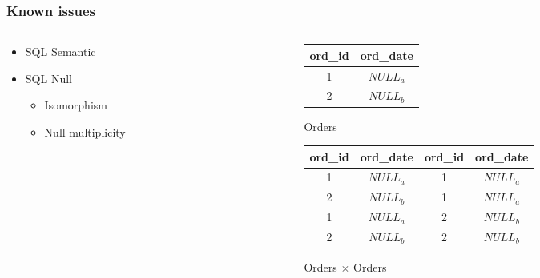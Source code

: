 \documentclass{beamer}
\begin{document}
		\begin{frame}
			\frametitle{Known issues}
			\begin{columns}
				\begin{column}{0.40\textwidth}
					\begin{itemize}
						\item SQL Semantic 
						\item<2->SQL Null
						\begin{itemize}
							\item<3-> Isomorphism
							\item<6-> Null multiplicity
						\end{itemize}
					\end{itemize}
				\end{column}
				\begin{column}{0.60\textwidth}
					\onslide<4->
					\begin{figure}
					\caption{Orders}
					\begin{tabular}{cc}
						\hline
						ord\_id & ord\_date \\
						\hline
						1 &  $NULL_a$ \\
						2 &  $NULL_b$ \\
						\hline
					\end{tabular}
				\end{figure}
				\begin{figure}
					\caption{Orders $\times$ Orders}
					\begin{tabular}{cccc}
						\hline
						ord\_id & ord\_date & ord\_id & ord\_date\\
						\hline
						1 &  $NULL_a$ & 1 &  $NULL_a$\\
						2 &  $NULL_b$ & 1 &  $NULL_a$\\
						1 &  $NULL_a$ & 2 &  $NULL_b$\\
						2 &  $NULL_b$ & 2 &  $NULL_b$\\
						\hline
					\end{tabular}
				\end{figure}
				\end{column}
			\end{columns}
		\end{frame}
		
\end{document}
